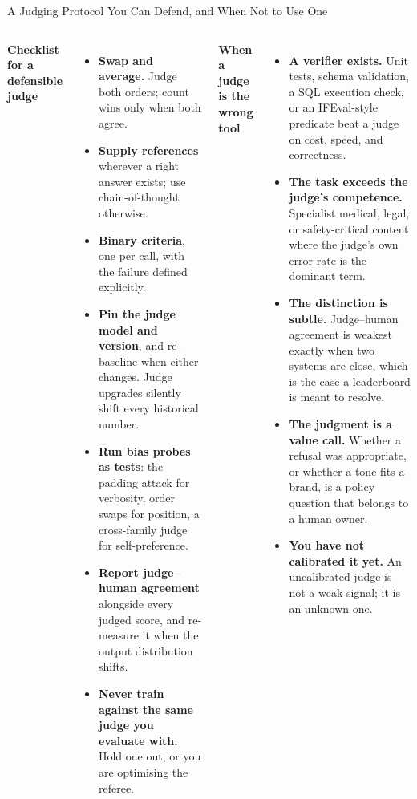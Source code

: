 \begin{frame}{A Judging Protocol You Can Defend, and When Not to Use One}
  \begin{columns}[T,onlytextwidth]
      {\footnotesize \textbf{Checklist for a defensible judge}}
      \begin{itemize}\footnotesize\itemsep0.22em
        \item[\textcolor{red}{$\blacktriangleright$}] \textbf{Swap and average.} Judge both orders; count wins only when both agree.
        \item[\textcolor{red}{$\blacktriangleright$}] \textbf{Supply references} wherever a right answer exists; use chain-of-thought otherwise.
        \item[\textcolor{red}{$\blacktriangleright$}] \textbf{Binary criteria}, one per call, with the failure defined explicitly.
        \item[\textcolor{red}{$\blacktriangleright$}] \textbf{Pin the judge model and version}, and re-baseline when either changes. Judge upgrades silently shift every historical number.
        \item[\textcolor{red}{$\blacktriangleright$}] \textbf{Run bias probes as tests}: the padding attack for verbosity, order swaps for position, a cross-family judge for self-preference.
        \item[\textcolor{red}{$\blacktriangleright$}] \textbf{Report judge--human agreement} alongside every judged score, and re-measure it when the output distribution shifts.
        \item[\textcolor{red}{$\blacktriangleright$}] \textbf{Never train against the same judge you evaluate with.} Hold one out, or you are optimising the referee.
      \end{itemize}
      {\footnotesize \textbf{When a judge is the wrong tool}}
      \begin{itemize}\footnotesize\itemsep0.24em
        \item[\textcolor{red}{$\blacktriangleright$}] \textbf{A verifier exists.} Unit tests, schema validation, a SQL execution check, or an IFEval-style predicate beat a judge on cost, speed, and correctness.
        \item[\textcolor{red}{$\blacktriangleright$}] \textbf{The task exceeds the judge's competence.} Specialist medical, legal, or safety-critical content where the judge's own error rate is the dominant term.
        \item[\textcolor{red}{$\blacktriangleright$}] \textbf{The distinction is subtle.} Judge--human agreement is weakest exactly when two systems are close, which is the case a leaderboard is meant to resolve.
        \item[\textcolor{red}{$\blacktriangleright$}] \textbf{The judgment is a value call.} Whether a refusal was appropriate, or whether a tone fits a brand, is a policy question that belongs to a human owner.
        \item[\textcolor{red}{$\blacktriangleright$}] \textbf{You have not calibrated it yet.} An uncalibrated judge is not a weak signal; it is an unknown one.
      \end{itemize}
  \end{columns}
\end{frame}
